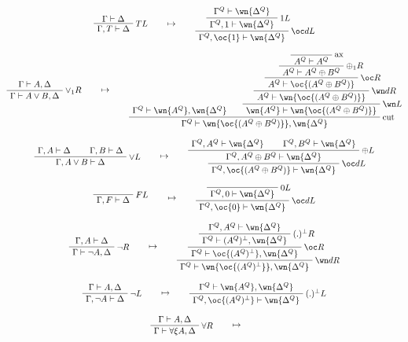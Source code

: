 \begin{gather*}
\AxRule{\Gamma\vdash \Delta}
\LabelRule{T L}
\UnaRule{\Gamma,T\vdash \Delta}
\DisplayProof
\qquad\mapsto\qquad
\AxRule{\Gamma^Q\vdash \wn{\Delta^Q}}
\LabelRule{\one L}
\UnaRule{\Gamma^Q,\one\vdash \wn{\Delta^Q}}
\LabelRule{\oc d L}
\UnaRule{\Gamma^Q,\oc{\one}\vdash \wn{\Delta^Q}}
\DisplayProof
\\[2ex]
\AxRule{\Gamma\vdash A,\Delta}
\LabelRule{\vee_1 R}
\UnaRule{\Gamma\vdash A\vee B,\Delta}
\DisplayProof
\qquad\mapsto\qquad
\AxRule{\Gamma^Q\vdash \wn{A^Q},\wn{\Delta^Q}}
\LabelRule{\rulename{ax}}
\NulRule{A^Q\vdash A^Q}
\LabelRule{\plus_1 R}
\UnaRule{A^Q\vdash A^Q\plus B^Q}
\LabelRule{\oc R}
\UnaRule{A^Q\vdash \oc{(A^Q\plus B^Q)}}
\LabelRule{\wn d R}
\UnaRule{A^Q\vdash \wn{\oc{(A^Q\plus B^Q)}}}
\LabelRule{\wn L}
\UnaRule{\wn{A^Q}\vdash \wn{\oc{(A^Q\plus B^Q)}}}
\LabelRule{\rulename{cut}}
\BinRule{\Gamma^Q\vdash \wn{\oc{(A^Q\plus B^Q)}},\wn{\Delta^Q}}
\DisplayProof
\\[2ex]
\AxRule{\Gamma,A\vdash \Delta}
\AxRule{\Gamma,B\vdash \Delta}
\LabelRule{\vee L}
\BinRule{\Gamma,A\vee B\vdash \Delta}
\DisplayProof
\qquad\mapsto\qquad
\AxRule{\Gamma^Q,A^Q\vdash \wn{\Delta^Q}}
\AxRule{\Gamma^Q,B^Q\vdash \wn{\Delta^Q}}
\LabelRule{\plus L}
\BinRule{\Gamma^Q,A^Q\plus B^Q\vdash \wn{\Delta^Q}}
\LabelRule{\oc d L}
\UnaRule{\Gamma^Q,\oc{(A^Q\plus B^Q)}\vdash \wn{\Delta^Q}}
\DisplayProof
\\[2ex]
\LabelRule{F L}
\NulRule{\Gamma,F\vdash \Delta}
\DisplayProof
\qquad\mapsto\qquad
\LabelRule{\zero L}
\NulRule{\Gamma^Q,\zero\vdash \wn{\Delta^Q}}
\LabelRule{\oc d L}
\UnaRule{\Gamma^Q,\oc{\zero}\vdash \wn{\Delta^Q}}
\DisplayProof
\\[2ex]
\AxRule{\Gamma,A\vdash \Delta}
\LabelRule{\neg R}
\UnaRule{\Gamma\vdash \neg A,\Delta}
\DisplayProof
\qquad\mapsto\qquad
\AxRule{\Gamma^Q,A^Q\vdash \wn{\Delta^Q}}
\LabelRule{(.)\orth R}
\UnaRule{\Gamma^Q\vdash (A^Q)\orth,\wn{\Delta^Q}}
\LabelRule{\oc R}
\UnaRule{\Gamma^Q\vdash \oc{(A^Q)\orth},\wn{\Delta^Q}}
\LabelRule{\wn d R}
\UnaRule{\Gamma^Q\vdash \wn{\oc{(A^Q)\orth}},\wn{\Delta^Q}}
\DisplayProof
\\[2ex]
\AxRule{\Gamma\vdash A,\Delta}
\LabelRule{\neg L}
\UnaRule{\Gamma,\neg A\vdash \Delta}
\DisplayProof
\qquad\mapsto\qquad
\AxRule{\Gamma^Q\vdash \wn{A^Q},\wn{\Delta^Q}}
\LabelRule{(.)\orth L}
\UnaRule{\Gamma^Q,\oc{(A^Q)\orth}\vdash \wn{\Delta^Q}}
\DisplayProof
\\[2ex]
\AxRule{\Gamma\vdash A,\Delta}
\LabelRule{\forall R}
\UnaRule{\Gamma\vdash \forall\xi A,\Delta}
\DisplayProof
\qquad\mapsto\qquad
\AxRule{\Gamma^Q\vdash \wn{A^Q},\wn{\Delta^Q}}

\end{gather*}
